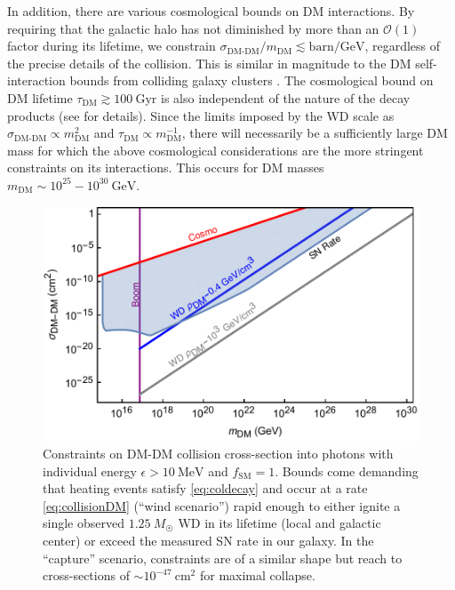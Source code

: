 \documentclass[twocolumn, preprintnumbers,amsmath,amssymb,prd, superscriptaddress]{revtex4}
\newcommand{\OO}{\mathcal{O}}
\newcommand{\GeV}{\text{GeV}}
\newcommand{\cm}{\text{cm}}
\begin{document}
In addition, there are various cosmological bounds on DM interactions.
By requiring that the galactic halo has not diminished by more than an $\OO(1)$ factor during its lifetime, we constrain $\sigma_\text{DM-DM}/m_\text{DM} \lesssim \text{barn}/\GeV$, regardless of the precise details of the collision.
This is similar in magnitude to the DM self-interaction bounds from colliding galaxy clusters \cite{Randall:2007ph}.
The cosmological bound on DM lifetime $\tau_\text{DM} \gtrsim 100 ~\text{Gyr}$ is also independent of the nature of the decay products (see \cite{Poulin:2016nat} for details).
Since the limits imposed by the WD scale as $\sigma_\text{DM-DM} \propto m_\text{DM}^2$ and $\tau_\text{DM} \propto m_\text{DM}^{-1}$, there will necessarily be a sufficiently large DM mass for which the above cosmological considerations are the more stringent constraints on its interactions.
This occurs for DM masses $m_\text{DM} \sim 10^{25} - 10^{30} ~\GeV$.


\begin{figure}
\includegraphics[scale=.45]{collisionobservation.pdf}
\caption{Constraints on DM-DM collision cross-section into photons with individual energy $\epsilon > 10~\text{MeV}$ and $f_\text{SM} = 1$. Bounds come demanding that heating events satisfy \eqref{eq:coldecay} and occur at a rate \eqref{eq:collisionDM} (``wind scenario'') rapid enough to either ignite a single observed $1.25~M_{\astrosun}$ WD in its lifetime (local and galactic center) or exceed the measured SN rate in our galaxy.  In the ``capture'' scenario, constraints are of a similar shape but reach to cross-sections of $\sim 10^{-47}~\cm^2$ for maximal collapse.}
\label{fig:collisionclasses}
\end{figure}
\end{document}
